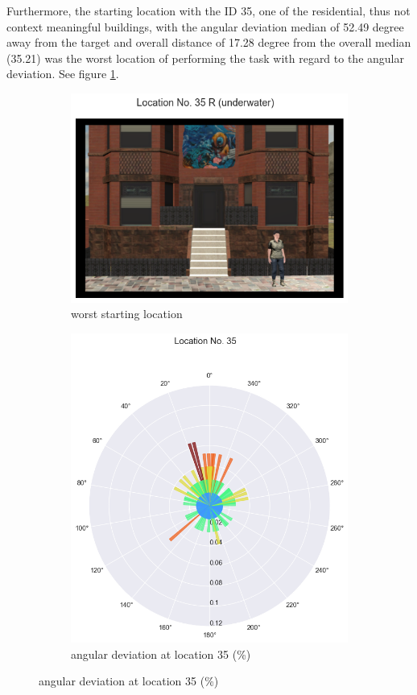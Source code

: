 Furthermore, the starting location with the ID 35, one of the residential, thus not context meaningful buildings, with the angular deviation median of 52.49 degree away from the target and overall distance of 17.28 degree from the overall median (35.21) was the worst location of performing the task with regard to the angular deviation. See figure \ref{fig:worst_angular}.

\begin{figure}[!htb]
	\begin{subfigure}[b]{0.48\linewidth}
		\includegraphics[width=\linewidth]{figures/worst_loc_angular_error__withHA_23.png}
		\caption{worst starting location}
		\label{fig:worst_angular}
	\end{subfigure}
	\begin{subfigure}[b]{0.48\linewidth}
		\includegraphics[width=\linewidth]{figures/deviation_degrees_loc_nr_35_23.png}
		\caption{angular deviation at location 35 (\%)}
		\label{fig:worst_angular_dist_35}
	\end{subfigure}


\end{figure}
